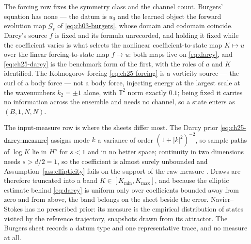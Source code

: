 The forcing row fixes the symmetry class and the channel count. Burgers' equation has
none --- the datum is $u_0$ and the learned object the forward evolution map $\mathcal{G}_t$
of \eqref{eq:ch03-burgers}, whose domain and codomain coincide. Darcy's source $f$ is fixed
and its formula unrecorded, and holding it fixed while the coefficient varies is what
selects the nonlinear coefficient-to-state map $K \mapsto u$ over the linear
forcing-to-state map $f \mapsto u$: both maps live on \eqref{eq:darcy}, and
\eqref{eq:ch25-darcy} is the benchmark form of the first, with the roles of $a$ and $K$
identified. The Kolmogorov forcing \eqref{eq:ch25-forcing} is
a vorticity source --- the curl of a body force --- not a body force, injecting energy at the
largest scale at the wavenumbers $k_2 = \pm 1$ alone, with $\mathbb{T}^{2}$ norm exactly
$0.1$; being fixed it carries no information across the ensemble and
needs no channel, so a state enters as $(B, 1, N, N)$.

The input-measure row is where the sheets differ most. The Darcy prior
\eqref{eq:ch25-darcy-measure} assigns mode $k$ a variance of order $(1+|k|^{2})^{-2}$, so
sample paths of $\log K$ lie in $H^{s}$ for $s < 1$ and in no better space; continuity in
two dimensions needs $s > d/2 = 1$, so the coefficient is almost surely unbounded and
Assumption~\ref{ass:ellipticity} fails on the support of the raw measure
\cite{stuart2010inverse}. Draws are therefore truncated into a band
$K \in [K_{\min}, K_{\max}]$, and because the elliptic estimate behind \eqref{eq:darcy} is
uniform only over coefficients bounded away from zero and from above, the band belongs on
the sheet beside the error. Navier--Stokes has no prescribed prior: its measure is the
empirical distribution of states visited by the reference trajectory, snapshots drawn from
its attractor. The Burgers sheet records a datum type and one representative trace, and no
measure at all.

